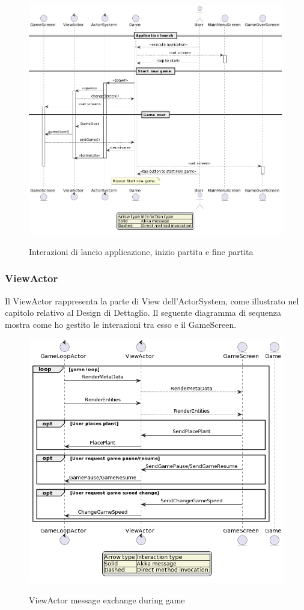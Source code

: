 \begin{figure}[H]
    \centering
    \caption{Interazioni di lancio applicazione, inizio partita e fine partita}
    \includegraphics[width=0.8\linewidth]{images/actors-game-interaction.png}
    \label{ScreenBehavior}
\end{figure}


\subsubsection{ViewActor}
Il ViewActor rappresenta la parte di View dell'ActorSystem, come illustrato nel capitolo relativo al Design di Dettaglio. Il seguente diagramma di sequenza mostra come ho gestito le interazioni tra esso e il GameScreen.

\begin{figure}[H]
    \centering
    \caption{ViewActor message exchange during game}
    \includegraphics[width=0.8\linewidth]{images/view-actor.png}
    \label{ScreenBehavior}
\end{figure}

